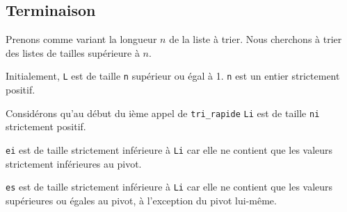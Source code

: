 


%

%
%
%
\subsection{Terminaison}

Prenons comme variant la longueur $n$ de la liste à trier.  Nous cherchons à trier des listes de tailles supérieure à $n$. 

Initialement, \texttt{L} est de taille \texttt{n} supérieur ou égal à 1. \texttt{n} est un entier strictement positif. 

Considérons qu'au début du ième appel de \texttt{tri\_rapide} \texttt{Li} est de taille \texttt{ni} strictement positif.

\texttt{ei} est de taille strictement inférieure à \texttt{Li} car elle ne contient que les valeurs strictement inférieures au pivot.  

\texttt{es} est de taille strictement inférieure à \texttt{Li} car elle ne contient que les valeurs supérieures ou égales au pivot, à l'exception du pivot lui-même. 

